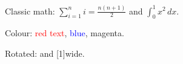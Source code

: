 \documentclass{article}
\begin{document}
Classic math: $\sum_{i=1}^n i = \frac{n(n+1)}{2}$ and $\int_0^1 x^2\,dx$.

Colour: \textcolor{red}{red text}, \textcolor{blue}{blue}, \textcolor[cmyk]{0,1,0,0}{magenta}.

Rotated:  and \scalebox{1.5}[1]{wide}.
\end{document}
